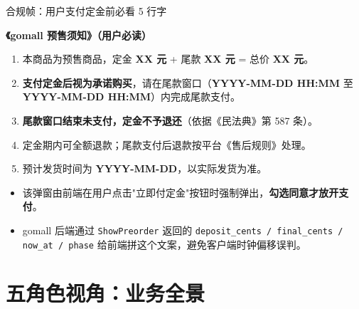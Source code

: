 \documentclass[aspectratio=169,11pt]{beamer}
\begin{document}
\begin{frame}[shrink]{合规帧：用户支付定金前必看 5 行字}
\begin{tcolorbox}[colback=cWarn!10,colframe=cWarn,boxrule=0.5pt]
\textbf{《gomall 预售须知》（用户必读）}
\begin{enumerate}\footnotesize
  \item 本商品为预售商品，定金 \textbf{XX 元} + 尾款 \textbf{XX 元} = 总价 \textbf{XX 元}。
  \item \textbf{支付定金后视为承诺购买}，请在尾款窗口（\textbf{YYYY-MM-DD HH:MM} 至 \textbf{YYYY-MM-DD HH:MM}）内完成尾款支付。
  \item \textbf{尾款窗口结束未支付，定金不予退还}（依据《民法典》第 587 条）。
  \item 定金期内可全额退款；尾款支付后退款按平台《售后规则》处理。
  \item 预计发货时间为 \textbf{YYYY-MM-DD}，以实际发货为准。
\end{enumerate}
\end{tcolorbox}
\vspace{1mm}
\begin{itemize}\small
  \item 该弹窗由前端在用户点击"立即付定金"按钮时强制弹出，\textbf{勾选同意才放开支付}。
  \item gomall 后端通过 \texttt{ShowPreorder} 返回的 \texttt{deposit\_cents / final\_cents / now\_at / phase} 给前端拼这个文案，避免客户端时钟偏移误判。
\end{itemize}
\end{frame}

\section{五角色视角：业务全景}
\end{document}
